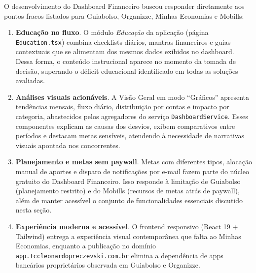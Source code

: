O desenvolvimento do Dashboard Financeiro buscou responder diretamente aos pontos fracos listados para Guiabolso, Organizze, Minhas Economias e Mobills:
\begin{enumerate}
    \item \textbf{Educação no fluxo}. O módulo \textit{Educação} da aplicação (página \texttt{Education.tsx}) combina checklists diários, mantras financeiros e guias contextuais que se alimentam dos mesmos dados exibidos no dashboard. Dessa forma, o conteúdo instrucional aparece no momento da tomada de decisão, superando o déficit educacional identificado em todas as soluções avaliadas.
    \item \textbf{Análises visuais acionáveis}. A Visão Geral em modo ``Gráficos'' apresenta tendências mensais, fluxo diário, distribuição por contas e impacto por categoria, abastecidos pelos agregadores do serviço \texttt{DashboardService}. Esses componentes explicam as causas dos desvios, exibem comparativos entre períodos e destacam metas sensíveis, atendendo à necessidade de narrativas visuais apontada nos concorrentes.
    \item \textbf{Planejamento e metas sem paywall}. Metas com diferentes tipos, alocação manual de aportes e disparo de notificações por e-mail fazem parte do núcleo gratuito do Dashboard Financeiro. Isso responde à limitação de Guiabolso (planejamento restrito) e do Mobills (recursos de metas atrás de paywall), além de manter acessível o conjunto de funcionalidades essenciais discutido nesta seção.
    \item \textbf{Experiência moderna e acessível}. O frontend responsivo (React 19 + Tailwind) entrega a experiência visual contemporânea que falta ao Minhas Economias, enquanto a publicação no domínio \texttt{app.tccleonardopreczevski.com.br} elimina a dependência de apps bancários proprietários observada em Guiabolso e Organizze.
\end{enumerate}
